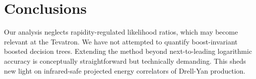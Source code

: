 \section{Conclusions}\label{sec:conclusions}

Our analysis neglects rapidity-regulated likelihood ratios, which may
become relevant at the Tevatron. We have not attempted to quantify
boost-invariant boosted decision trees. Extending the method beyond
next-to-leading logarithmic accuracy is conceptually straightforward but
technically demanding. This sheds new light on infrared-safe projected
energy correlators of Drell-Yan production.

